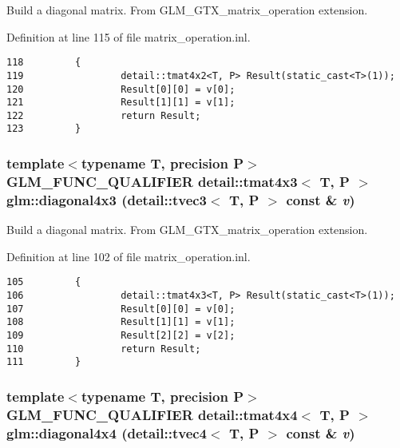 Build a diagonal matrix. From GLM\_\-GTX\_\-matrix\_\-operation extension. 

Definition at line 115 of file matrix\_\-operation.inl.

\begin{Code}\begin{verbatim}118         {
119                 detail::tmat4x2<T, P> Result(static_cast<T>(1));
120                 Result[0][0] = v[0];
121                 Result[1][1] = v[1];
122                 return Result;          
123         }
\end{verbatim}
\end{Code}


\hypertarget{group__gtx__matrix__operation_g9b918f5e6a6224398447d2c79861d8fd}{
\subsubsection[diagonal4x3]{\setlength{\rightskip}{0pt plus 5cm}template$<$typename T, precision P$>$ GLM\_\-FUNC\_\-QUALIFIER detail::tmat4x3$<$ T, P $>$ glm::diagonal4x3 (detail::tvec3$<$ T, P $>$ const \& {\em v})}}
\label{group__gtx__matrix__operation_g9b918f5e6a6224398447d2c79861d8fd}


Build a diagonal matrix. From GLM\_\-GTX\_\-matrix\_\-operation extension. 

Definition at line 102 of file matrix\_\-operation.inl.

\begin{Code}\begin{verbatim}105         {
106                 detail::tmat4x3<T, P> Result(static_cast<T>(1));
107                 Result[0][0] = v[0];
108                 Result[1][1] = v[1];
109                 Result[2][2] = v[2];
110                 return Result;          
111         }
\end{verbatim}
\end{Code}


\hypertarget{group__gtx__matrix__operation_g32c8da8ef592e0c0891d1593ffb524db}{
\subsubsection[diagonal4x4]{\setlength{\rightskip}{0pt plus 5cm}template$<$typename T, precision P$>$ GLM\_\-FUNC\_\-QUALIFIER detail::tmat4x4$<$ T, P $>$ glm::diagonal4x4 (detail::tvec4$<$ T, P $>$ const \& {\em v})}}
\label{group__gtx__matrix__operation_g32c8da8ef592e0c0891d1593ffb524db}


